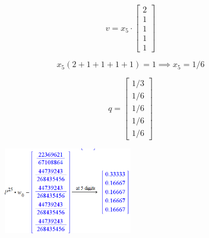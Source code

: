 \documentclass{article}
\begin{document}
\begin{equation}
    v = x_5 \cdot
    \begin{bmatrix}
        2 \\
        1 \\
        1 \\
        1 \\
        1
    \end{bmatrix}
\end{equation}

\begin{equation}
    x_5(2 + 1 + 1 + 1 + 1) = 1 \implies x_5 = 1/6
\end{equation}

\begin{equation}
    q =
    \begin{bmatrix}
        1/3 \\
        1/6 \\
        1/6 \\
        1/6 \\
        1/6
    \end{bmatrix}
\end{equation}

\begin{figure}
    \centering
    \includegraphics[width=0.5\textwidth]{check}
\end{figure}
\end{document}
